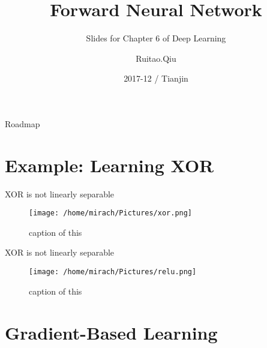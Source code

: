 \documentclass{beamer}
\title[Chapter 6 of Deep Learning] %
{Forward Neural Network}
\subtitle
{Slides for Chapter 6 of Deep Learning} %
\author[Ruitao.Qiu]
{Ruitao.Qiu}
\institute[Universities of Somewhere and Elsewhere]
{
  Algorithm Engineer\\
  Wireless Dev, ZTE}
\date[Short Occasion] %
{2017-12 / Tianjin}
\begin{document}
\begin{frame}
  \titlepage
\end{frame}

\begin{frame}{Roadmap}
  \tableofcontents
\end{frame}




\section{Example: Learning XOR}

\begin{frame}{XOR is not linearly separable}
	\begin{figure}
		\centering  
		\texttt{[image: /home/mirach/Pictures/xor.png]}  
		\caption{caption of this}  
	\end{figure}  
\end{frame}

\begin{frame}{XOR is not linearly separable}
	\begin{figure}
		\centering  
		\texttt{[image: /home/mirach/Pictures/relu.png]}  
		\caption{caption of this}  
	\end{figure}  
\end{frame}

\section{Gradient-Based Learning}
\end{document}

